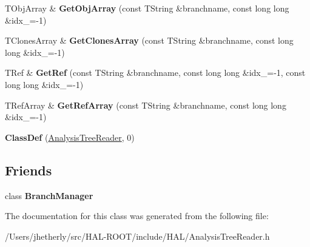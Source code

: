 \begin{DoxyCompactItemize}
\item 
\hypertarget{class_h_a_l_1_1_analysis_tree_reader_ad44870dd8478b8d404ede307726f2db6}{T\+Obj\+Array \& {\bfseries Get\+Obj\+Array} (const T\+String \&branchname, const long long \&idx\+\_=-\/1)}\label{class_h_a_l_1_1_analysis_tree_reader_ad44870dd8478b8d404ede307726f2db6}

\item 
\hypertarget{class_h_a_l_1_1_analysis_tree_reader_ae9115ce6bba555009b6b21eca20339c9}{T\+Clones\+Array \& {\bfseries Get\+Clones\+Array} (const T\+String \&branchname, const long long \&idx\+\_=-\/1)}\label{class_h_a_l_1_1_analysis_tree_reader_ae9115ce6bba555009b6b21eca20339c9}

\item 
\hypertarget{class_h_a_l_1_1_analysis_tree_reader_af010b9fafb8bd7f06efcaa46d1360253}{T\+Ref \& {\bfseries Get\+Ref} (const T\+String \&branchname, const long long \&idx\+\_=-\/1, const long long \&idx\+\_=-\/1)}\label{class_h_a_l_1_1_analysis_tree_reader_af010b9fafb8bd7f06efcaa46d1360253}

\item 
\hypertarget{class_h_a_l_1_1_analysis_tree_reader_a66bc43933f69938b94dd8caf5277395c}{T\+Ref\+Array \& {\bfseries Get\+Ref\+Array} (const T\+String \&branchname, const long long \&idx\+\_=-\/1)}\label{class_h_a_l_1_1_analysis_tree_reader_a66bc43933f69938b94dd8caf5277395c}

\item 
\hypertarget{class_h_a_l_1_1_analysis_tree_reader_ad8be72de7b7f4ae5ced82c636ac91dd1}{{\bfseries Class\+Def} (\hyperlink{class_h_a_l_1_1_analysis_tree_reader}{Analysis\+Tree\+Reader}, 0)}\label{class_h_a_l_1_1_analysis_tree_reader_ad8be72de7b7f4ae5ced82c636ac91dd1}

\end{DoxyCompactItemize}
\subsection*{Friends}
\begin{DoxyCompactItemize}
\item 
\hypertarget{class_h_a_l_1_1_analysis_tree_reader_a3b527c540b6431b5700a6d002214747c}{class {\bfseries Branch\+Manager}}\label{class_h_a_l_1_1_analysis_tree_reader_a3b527c540b6431b5700a6d002214747c}

\end{DoxyCompactItemize}


The documentation for this class was generated from the following file\+:\begin{DoxyCompactItemize}
\item 
/\+Users/jhetherly/src/\+H\+A\+L-\/\+R\+O\+O\+T/include/\+H\+A\+L/Analysis\+Tree\+Reader.\+h\end{DoxyCompactItemize}
